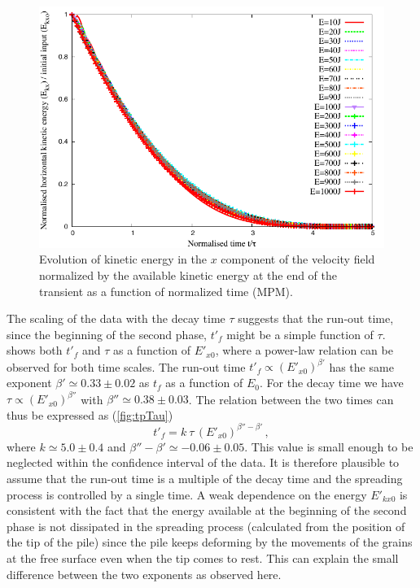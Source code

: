 \begin{figure}[tbhp]
\centering
\includegraphics[width=\textwidth]{EkxKoTTau_Slope}
\caption{Evolution of kinetic energy in the $x$ component of 
the velocity field  normalized by the available kinetic energy at the end of 
the transient as a function of normalized time (MPM).}
\label{fig:ExEx0_vs_ttau}
\end{figure}


The scaling of the data with the decay time $\tau$ suggests that the 
run-out time, since the beginning of the second phase, $t'_f$ might be a simple 
function of $\tau$.~ shows both $t'_f$ and $\tau$ as 
a function of $E'_{x0}$, where a power-law relation can be observed for both 
time scales. The run-out time $t'_f \propto (E'_{x0})^{\beta'}$ has the 
same exponent $\beta' \simeq 0.33 \pm 0.02$ as $t_f$ as a function of $E_0$. 
For the decay time we have $\tau \propto (E'_{x0})^{\beta''}$ with $\beta'' 
\simeq 0.38 \pm 0.03$. The relation between the two times can thus be expressed 
as (\cref{fig:tpTau})
\begin{equation}
t'_f = k  \ \tau \, (E'_{x0})^{\beta'' - \beta'} \,,
\label{eqn:t'f}
\end{equation}
where $k \simeq 5.0 \pm 0.4$ and $\beta'' - \beta' \simeq -0.06 \pm 0.05$. This 
value is small enough to be neglected within the confidence interval of the 
data. It is therefore plausible to assume that the run-out time is a multiple 
of the decay time and the spreading process is controlled by a single time. A 
weak dependence on the energy $E'_{kx0}$ is consistent with the fact that the  
energy available at the beginning of the second phase is not dissipated in the 
spreading process (calculated from the position of the tip of the pile) since  
the pile keeps deforming by the movements of the grains at the free surface 
even when the tip comes to rest. This can explain the small difference between 
the two exponents as observed here.


